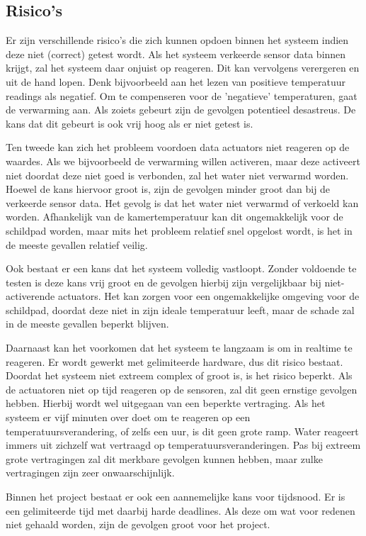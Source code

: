 \documentclass[a4paper]{report}
\begin{document}
\subsection{Risico's}
Er zijn verschillende risico's die zich kunnen opdoen binnen het systeem indien deze niet (correct) getest wordt.
Als het systeem verkeerde sensor data binnen krijgt, zal het systeem daar onjuist op reageren. Dit kan vervolgens verergeren en uit de hand lopen. 
Denk bijvoorbeeld aan het lezen van positieve temperatuur readings als negatief. Om te compenseren voor de 'negatieve' temperaturen, gaat de verwarming aan.
Als zoiets gebeurt zijn de gevolgen potentieel desastreus. De kans dat dit gebeurt is ook vrij hoog als er niet getest is.
\par \smallskip 
Ten tweede kan zich het probleem voordoen data actuators niet reageren op de waardes. 
Als we bijvoorbeeld de verwarming willen activeren, maar deze activeert niet doordat deze niet goed is verbonden, zal het water niet verwarmd worden.
Hoewel de kans hiervoor groot is, zijn de gevolgen minder groot dan bij de verkeerde sensor data. Het gevolg is dat het water niet verwarmd of verkoeld kan worden. 
Afhankelijk van de kamertemperatuur kan dit ongemakkelijk voor de schildpad worden, maar mits het probleem relatief snel opgelost wordt, is het in de meeste gevallen relatief veilig. 
\par \smallskip 
Ook bestaat er een kans dat het systeem volledig vastloopt. Zonder voldoende te testen is deze kans vrij groot en de gevolgen hierbij zijn vergelijkbaar bij niet-activerende actuators. 
Het kan zorgen voor een ongemakkelijke omgeving voor de schildpad, doordat deze niet in zijn ideale temperatuur leeft, maar de schade zal in de meeste gevallen beperkt blijven.
\par \smallskip
Daarnaast kan het voorkomen dat het systeem te langzaam is om in realtime te reageren. Er wordt gewerkt met gelimiteerde hardware, dus dit risico bestaat. 
Doordat het systeem niet extreem complex of groot is, is het risico beperkt. Als de actuatoren niet op tijd reageren op de sensoren, zal dit geen ernstige gevolgen hebben. 
Hierbij wordt wel uitgegaan van een beperkte vertraging. Als het systeem er vijf minuten over doet om te reageren op een temperatuursverandering, of zelfs een uur, is dit geen grote ramp.
Water reageert immers uit zichzelf wat vertraagd op temperatuursveranderingen. Pas bij extreem grote vertragingen zal dit merkbare gevolgen kunnen hebben, maar zulke vertragingen zijn zeer onwaarschijnlijk.
\par \smallskip 
Binnen het project bestaat er ook een aannemelijke kans voor tijdsnood. Er is een gelimiteerde tijd met daarbij harde deadlines. 
Als deze om wat voor redenen niet gehaald worden, zijn de gevolgen groot voor het project. 
\end{document}
